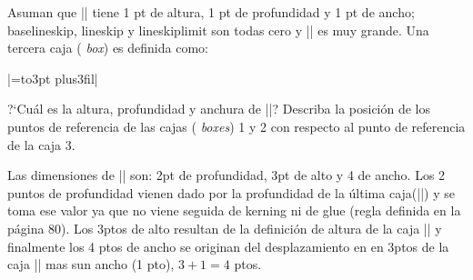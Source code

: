 


\bigskip

\enunciadoS Asuman que || tiene 1 pt de altura, 1 pt de
profundidad y 1 pt de ancho; baselineskip, lineskip y lineskiplimit
son todas cero y |\boxmaxdepth| es muy grande. Una tercera caja ({\it
box}) es definida como:

\medskip 

|=\vbox to3pt{\vskip-3pt plus3fil}|

\medskip 

\noindent ?`Cu\'al es la altura, profundidad y anchura de ||?
Describa la posici\'on de los puntos de referencia de las cajas ({\it
boxes}) 1 y 2 con respecto al punto de referencia de la caja 3.

\bigskip

\respuestaS Las dimensiones de || son: 2pt de profundidad, 3pt de
alto y 4 de ancho. Los 2 puntos de profundidad vienen dado por la
profundidad de la \'ultima caja(||) y se toma ese valor ya que no
viene seguida de kerning ni de glue (regla definida en la página
80). Los 3ptos de alto resultan de la definici\'on de altura de la
caja || y finalmente los 4 ptos de ancho se originan del
desplazamiento en en 3ptos de la caja || mas sun ancho (1 pto), $
3 + 1 = 4$ ptos.

\bye

